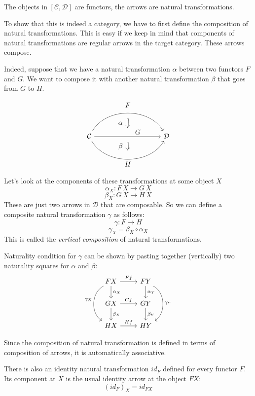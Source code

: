 \documentclass[DaoFP]{subfiles}
\begin{document}
The objects in $[\mathcal{C}, \mathcal{D}]$ are functors, the arrows are natural transformations. 

To show that this is indeed a category, we have to first define the composition of natural transformations. This is easy if we keep in mind that components of natural transformations are regular arrows in the target category. These arrows compose.

Indeed, suppose that we have a natural transformation $\alpha$ between two functors $F$ and $G$. We want to compose it with another natural transformation $\beta$ that goes from $G$ to $H$. 

\[
\begin{tikzcd}[column sep=huge]
\mathcal{C}
  \arrow[bend left=60]{rr}[name=U, label=above:$F$]{}
  \arrow[]{rr}[name=M, label={[xshift=15pt, yshift=-5pt]:$G$}]{} 
  \arrow[bend right=60]{rr}[name=D, label=below:$H$]{} 
 &&
\mathcal{D}
  \arrow[shorten <=8pt, shorten >=8pt,Rightarrow, to path={(U) -- node[label=left:$\alpha$] {} (M)}]{}
  \arrow[shorten <=8pt, shorten >=8pt,Rightarrow, to path={(M) -- node[label=left:$\beta$] {} (D)}]{}
\end{tikzcd}
\]


Let's look at the components of these transformations at some object $X$
\[ \alpha_X \colon F \, X \to G \, X \]
\[ \beta_X \colon G \, X \to H \, X \]
These are just two arrows in $\mathcal{D}$ that are composable. So we can define a composite natural transformation $\gamma$ as follows:
\[ \gamma \colon F \to H\]
\[ \gamma_X = \beta_X \circ \alpha_X \]
 This is called the \emph{vertical composition} of natural transformations.

Naturality condition for $\gamma$ can be shown by pasting together (vertically) two naturality squares for $\alpha$ and $\beta$:
\[
 \begin{tikzcd}
 F X
 \arrow[d, "\alpha_X"]
 \arrow[r, "F f"]
 \arrow[dd, bend right = 60, "\gamma_X"']
 &
F Y
  \arrow[d, "\alpha_Y"]
 \arrow[dd, bend left = 60, "\gamma_Y"]
 \\
G X
 \arrow[r, "G f"]
 \arrow[d, "\beta_X"]
& G Y
\arrow[d, "\beta_Y"]
\\
H X
\arrow[r, "H f"]
& H Y
 \end{tikzcd}
\]

Since the composition of natural transformation is defined in terms of composition of arrows, it is automatically associative. 

There is also an identity natural transformation $id_F$ defined for every functor $F$. Its component at $X$ is the usual identity arrow at the object $F X$:
\[ (id_F)_X = id_{F X} \]
\end{document}
